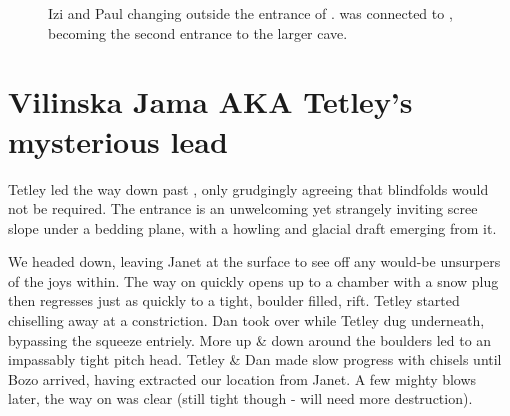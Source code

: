 \begin{figure}[t]
\checkoddpage \ifoddpage \forcerectofloat \else \forceversofloat \fi
{}
\caption{Izi and Paul changing outside the entrance of \protect{}. \protect{} was connected to \protect{}, becoming the second entrance to the larger cave. }
\end{figure}

\section{Vilinska Jama AKA Tetley's mysterious lead}

Tetley led the way down past , only grudgingly agreeing that blindfolds would not be required. The entrance is an unwelcoming yet
strangely inviting scree slope under a bedding plane, with a howling and
glacial draft emerging from it.

We headed down, leaving Janet at the surface to see off any would-be
unsurpers of the joys within. The way on quickly opens up to a chamber
with a snow plug then regresses just as quickly to a tight, boulder
filled, rift. Tetley started chiselling away at a constriction. Dan took
over while Tetley dug underneath, bypassing the squeeze entriely. More
up \& down around the boulders led to an impassably tight pitch head.
Tetley \& Dan made slow progress with chisels until Bozo arrived, having
extracted our location from Janet. A few mighty blows later, the way on
was clear (still tight though - will need more destruction).

